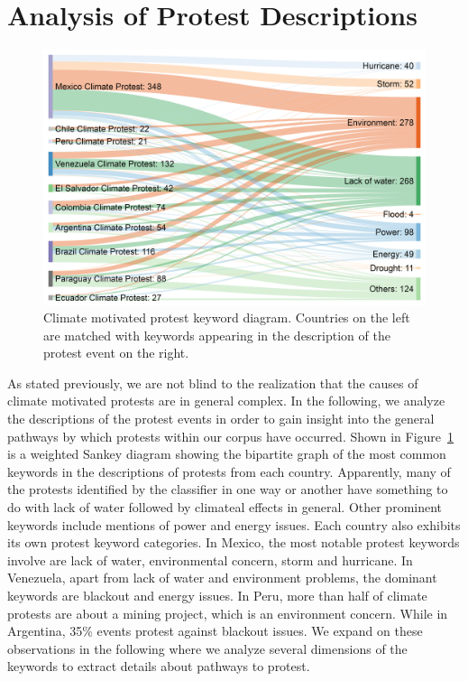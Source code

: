 \documentclass[9pt,twocolumn,twoside]{pnas-new}
\begin{document}
\section{Analysis of Protest Descriptions}
\begin{figure}[t]
\centerline
{\includegraphics[width=.4\textwidth]{figures/causality1}}
\caption{Climate motivated protest keyword diagram. Countries on the left are matched with keywords appearing in the description of the protest event on the right.}
\label{causality}
\end{figure}

As stated previously, we are not blind to the realization that the causes of climate motivated protests are in general complex.
In the following, we analyze the descriptions of the protest events in order to gain insight into the general pathways by which protests within our corpus have occurred.
Shown in Figure~\ref{causality} is a weighted Sankey diagram showing the bipartite graph of the most common keywords in the descriptions of protests from each country.
Apparently, many of the protests identified by the classifier in one way or another have something to do with lack of water followed by climateal effects in general.
Other prominent keywords include mentions of power and energy issues.
Each country also exhibits its own protest keyword categories.
In Mexico, the most notable protest keywords involve are lack of water, environmental concern, storm and hurricane.
In Venezuela, apart from lack of water and environment problems, the dominant keywords are blackout and energy issues.
In Peru, more than half of climate protests are about a mining project, which is an environment concern.
While in Argentina, 35\% events protest against blackout issues.
We expand on these observations in the following where we analyze several dimensions of the keywords to extract details about pathways to protest.
\end{document}
